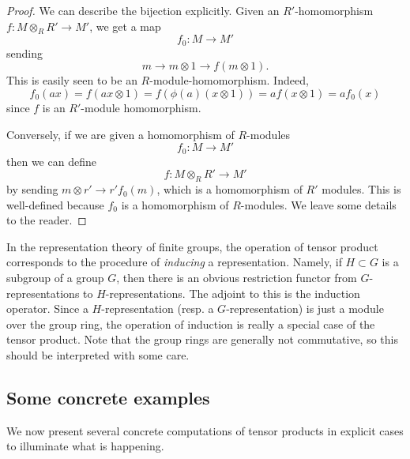 \begin{proof}
We can describe the bijection explicitly. Given an $R'$-homomorphism $f:M
\otimes_R R' \to M'$, we get a map
\[ f_0:M \to M'  \]
sending
\[ m \to m \otimes 1 \to f(m \otimes 1).  \]
This is easily seen to be an $R$-module-homomorphism. Indeed,
\[ f_0(ax) = f(ax \otimes 1) = f(\phi(a)(x \otimes 1)) = a f(x \otimes 1)  =
a f_0(x)  \]
since $f$ is an $R'$-module homomorphism.

Conversely, if we are given a homomorphism of $R$-modules
\[ f_0: M \to M'  \]
then we can define
\[ f: M \otimes_R R' \to M'  \]
by sending $m \otimes r' \to r' f_0(m)$, which is a homomorphism of $R'$
modules.
This is well-defined because $f_0$ is  a homomorphism of $R$-modules. We leave
some details to the reader.
\end{proof}

\begin{example}
In the representation theory of finite groups, the operation of tensor product
corresponds to the procedure of \emph{inducing} a representation. Namely, if
$H \subset G$ is a subgroup of a group $G$, then there is an obvious
restriction functor from $G$-representations to $H$-representations.
The adjoint to this is the induction operator. Since a $H$-representation
(resp. a $G$-representation) is just a module over the group ring, the
operation of induction is really a special case of the tensor product. Note
that the group rings are generally not commutative, so this should be
interpreted with some care.
\end{example}

\subsection{Some concrete examples}

We now present several concrete computations of tensor products in explicit
cases to illuminate what is happening.

